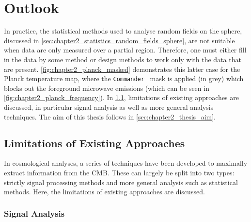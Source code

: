 

\section{Outlook}\label{sec:chapter2_outlook}

In practice, the statistical methods used to analyse random fields on the sphere, discussed in \cref{sec:chapter2_statistics_random_fields_sphere}, are not suitable when data are only measured over a partial region.
Therefore, one must either fill in the data by some method or design methods to work only with the data that are present.
\cref{fig:chapter2_planck_masked} demonstrates this latter case for the Planck temperature map, where the \texttt{Commander}~\cite{Eriksen2004,Eriksen2008,Planck2016,Planck2020a} mask is applied (in grey) which blocks out the foreground microwave emissions (which can be seen in \cref{fig:chapter2_planck_frequency}).
In \cref{sec:chapter2_limitations_existing_approaches}, limitations of existing approaches are discussed, in particular signal analysis as well as more general analysis techniques.
The aim of this thesis follows in \cref{sec:chapter2_thesis_aim}.



\subsection{Limitations of Existing Approaches}\label{sec:chapter2_limitations_existing_approaches}

In cosmological analyses, a series of techniques have been developed to maximally extract information from the CMB\@.
These can largely be split into two types: strictly signal processing methods and more general analysis such as statistical methods.
Here, the limitations of existing approaches are discussed.

\subsubsection{Signal Analysis}\label{sec:chapter2_signal_analysis}

